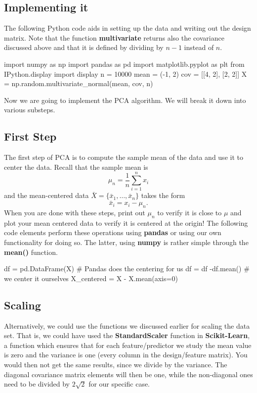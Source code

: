\documentclass[%
oneside,                 %
final,                   %
10pt]{article}
\begin{document}
\subsection{Implementing it}
The following Python code aids in setting up the data and writing out the design matrix.
Note that the function \textbf{multivariate} returns also the covariance discussed above and that it is defined by dividing by $n-1$ instead of $n$.









\bpycod
import numpy as np
import pandas as pd
import matplotlib.pyplot as plt
from IPython.display import display
n = 10000
mean = (-1, 2)
cov = [[4, 2], [2, 2]]
X = np.random.multivariate_normal(mean, cov, n)

\epycod


Now we are going to implement the PCA algorithm. We will break it down into various substeps.

\subsection{First Step}

The first step of PCA is to compute the sample mean of the data and use it to center the data. Recall that the sample mean is
\[
\mu_n = \frac{1}{n} \sum_{i=1}^n x_i
\]
and the mean-centered data $\bar{X} = \{ \bar{x}_1, \ldots, \bar{x}_n \}$ takes the form
\[
\bar{x}_i = x_i - \mu_n.
\]
When you are done with these steps, print out $\mu_n$ to verify it is
close to $\mu$ and plot your mean centered data to verify it is
centered at the origin! 
The following code elements perform these operations using \textbf{pandas} or using our own functionality for doing so. The latter, using \textbf{numpy} is rather simple through the \textbf{mean()} function. 






\bpycod
df = pd.DataFrame(X)
# Pandas does the centering for us
df = df -df.mean()
# we center it ourselves
X_centered = X - X.mean(axis=0)

\epycod


\subsection{Scaling}
Alternatively, we could use the functions we discussed
earlier for scaling the data set.  That is, we could have used the
\textbf{StandardScaler} function in \textbf{Scikit-Learn}, a function which ensures
that for each feature/predictor we study the mean value is zero and
the variance is one (every column in the design/feature matrix).  You
would then not get the same results, since we divide by the
variance. The diagonal covariance matrix elements will then be one,
while the non-diagonal ones need to be divided by $2\sqrt{2}$ for our
specific case.
\end{document}
